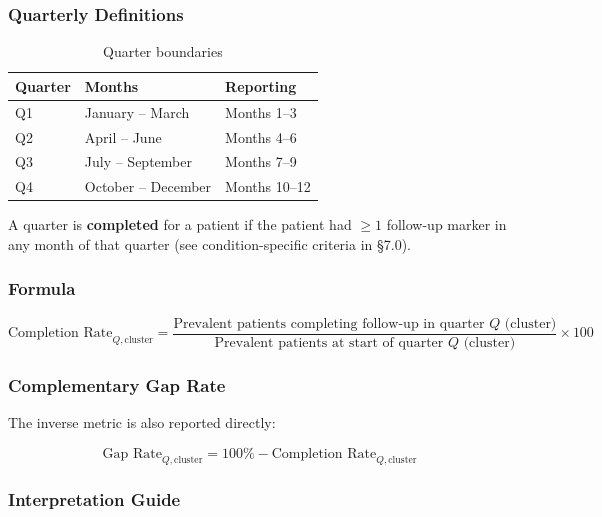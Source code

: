 \documentclass[11pt,a4paper]{article}
\begin{document}
\subsubsection{Quarterly Definitions}

\begin{table}[ht]
\centering
\caption{Quarter boundaries}
\begin{tabular}{@{}lll@{}}
\toprule
\textbf{Quarter} & \textbf{Months} & \textbf{Reporting} \\
\midrule
Q1 & January -- March   & Months 1--3 \\
Q2 & April -- June      & Months 4--6 \\
Q3 & July -- September  & Months 7--9 \\
Q4 & October -- December & Months 10--12 \\
\bottomrule
\end{tabular}
\end{table}

A quarter is \textbf{completed} for a patient if the patient had $\geq 1$ follow-up marker in any month of that quarter (see condition-specific criteria in §7.0).

\subsubsection{Formula}

\begin{equation}
\text{Completion Rate}_{Q, \text{cluster}} =
\frac{\text{Prevalent patients completing follow-up in quarter } Q \text{ (cluster)}}
     {\text{Prevalent patients at start of quarter } Q \text{ (cluster)}} \times 100
\end{equation}

\subsubsection{Complementary Gap Rate}

The inverse metric is also reported directly:

\begin{equation}
\text{Gap Rate}_{Q, \text{cluster}} = 100\% - \text{Completion Rate}_{Q, \text{cluster}}
\end{equation}

\subsubsection{Interpretation Guide}
\end{document}
